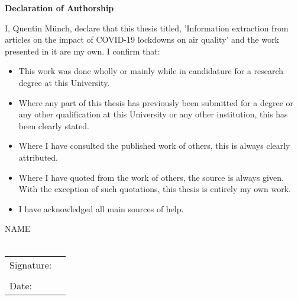 \begin{center}
    \Large
    \textbf{Declaration of Authorship}
\end{center}

\vspace*{1em}

\noindent I, Quentin Münch, declare that this thesis titled, 'Information extraction from articles on the impact of COVID-19 lockdowns on air quality' and the work presented in it are my own. I confirm that:

\vspace*{3em}

\begin{itemize}
    \item This work was done wholly or mainly while in candidature for a research degree at this University.
    \item Where any part of this thesis has previously been submitted for a degree or any other qualification at this University or any other institution, this has been clearly stated.
    \item Where I have consulted the published work of others, this is always clearly attributed.
    \item Where I have quoted from the work of others, the source is always given. With the exception of such quotations, this thesis is entirely my own work.
    \item I have acknowledged all main sources of help.
\end{itemize}

\vspace*{2.5em}

\noindent NAME \\ \\
\begin{tabular}{@{}p{.72in}p{3.0in}@{}}
    Signature: & \hrulefill \\
    &\\
    Date:   & \hrulefill
\end{tabular}

